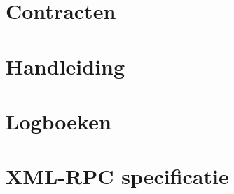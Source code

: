 \documentclass[a4paper,oneside,draft]{memoir}
\begin{document}
\chapter{Contracten}
\label{chap:contract}


\chapter{Handleiding}
\label{chap:installatie}


\chapter{Logboeken}
\label{chap:logboeken}


\chapter{XML-RPC specificatie}
\label{chap:xmlrpc}
\begin{otherlanguage}{english}

\end{otherlanguage}
\end{document}
